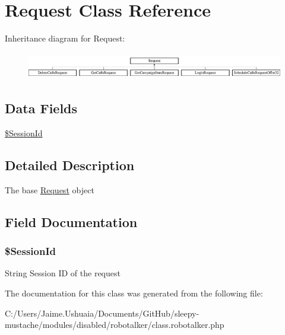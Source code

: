 \hypertarget{class_request}{\section{Request Class Reference}
\label{class_request}
}
Inheritance diagram for Request\-:\begin{figure}[H]
\begin{center}
\leavevmode
\includegraphics[height=1.204301cm]{class_request}
\end{center}
\end{figure}
\subsection*{Data Fields}
\begin{DoxyCompactItemize}
\item 
\hyperlink{class_request_af36f2c89cc01324e295786be80a30f3a}{\$\-Session\-Id}
\end{DoxyCompactItemize}


\subsection{Detailed Description}
The base \hyperlink{class_request}{Request} object 

\subsection{Field Documentation}
\hypertarget{class_request_af36f2c89cc01324e295786be80a30f3a}{
\subsubsection[{\$\-Session\-Id}]{\setlength{\rightskip}{0pt plus 5cm}\$Session\-Id}}\label{class_request_af36f2c89cc01324e295786be80a30f3a}
String Session I\-D of the request 

The documentation for this class was generated from the following file\-:\begin{DoxyCompactItemize}
\item 
C\-:/\-Users/\-Jaime.\-Ushuaia/\-Documents/\-Git\-Hub/sleepy-\/mustache/modules/disabled/robotalker/class.\-robotalker.\-php\end{DoxyCompactItemize}
